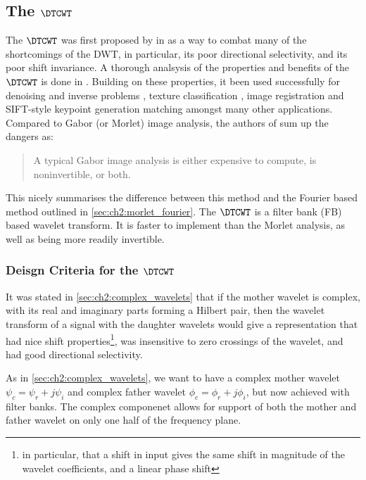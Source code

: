 \subsection{The $\DTCWT$}
  The $\DTCWT$ was first proposed by \citeauthor{kingsbury_dual-tree_1998} in
  \cite{kingsbury_dual-tree_1998, kingsbury_dual-tree_1998-1} as a way to combat
  many of the shortcomings of the DWT, in particular, its poor directional
  selectivity, and its poor shift invariance. A thorough analsysis of the
  properties and benefits of the $\DTCWT$ is done in
  \cite{kingsbury_image_1999,selesnick_dual-tree_2005}. Building on these
  properties, it been used
  successfully for denoising and inverse problems \cite{rivaz_bayesian_2001,
  zhang_bayesian_2008, zhang_variational_2015, miller_image_2008}, texture
  classification \cite{hatipoglu_texture_1999, rivaz_complex_1999}, image
  registration \cite{loo_motion-estimation-based_2001, chen_efficient_2012}
  and SIFT-style keypoint generation matching \cite{fauqueur_multiscale_2006,
  anderson_determining_2005, anderson_rotation-invariant_2006,
  bendale_multiscale_2010, ng_robust_2012} amongst many other applications. 
  Compared to Gabor (or Morlet) image analysis, the authors of
  \cite{selesnick_dual-tree_2005} sum up the dangers as:
  \begin{quote}
    A typical Gabor image analysis is either expensive to compute, is
    noninvertible, or both.
  \end{quote}
  This nicely summarises the difference between this method and the Fourier
  based method outlined in \autoref{sec:ch2:morlet_fourier}. The $\DTCWT$ is
  a filter bank (FB) based wavelet transform. It is faster
  to implement than the Morlet analysis, as well as being more readily invertible.

\subsubsection{Deisgn Criteria for the $\DTCWT$}
  It was stated in \autoref{sec:ch2:complex_wavelets} that if the mother wavelet
  is complex, with its real and imaginary parts forming a Hilbert pair, then the
  wavelet transform of a signal with the daughter wavelets would give a
  representation that had nice shift properties\footnote{in particular, that a
  shift in input gives the same shift in magnitude of the wavelet coefficients,
  and a linear phase shift}, was insensitive to zero crossings of the wavelet,
  and had good directional selectivity. 
  
  As in \autoref{sec:ch2:complex_wavelets}, we want to have a complex mother
  wavelet $\psi_c = \psi_r + j\psi_i$ and complex father wavelet $\phi_c =
  \phi_r + j\phi_i$, but now achieved with filter banks. The complex componenet
  allows for support of both the mother and father wavelet on only one half of
  the frequency plane. 
  
